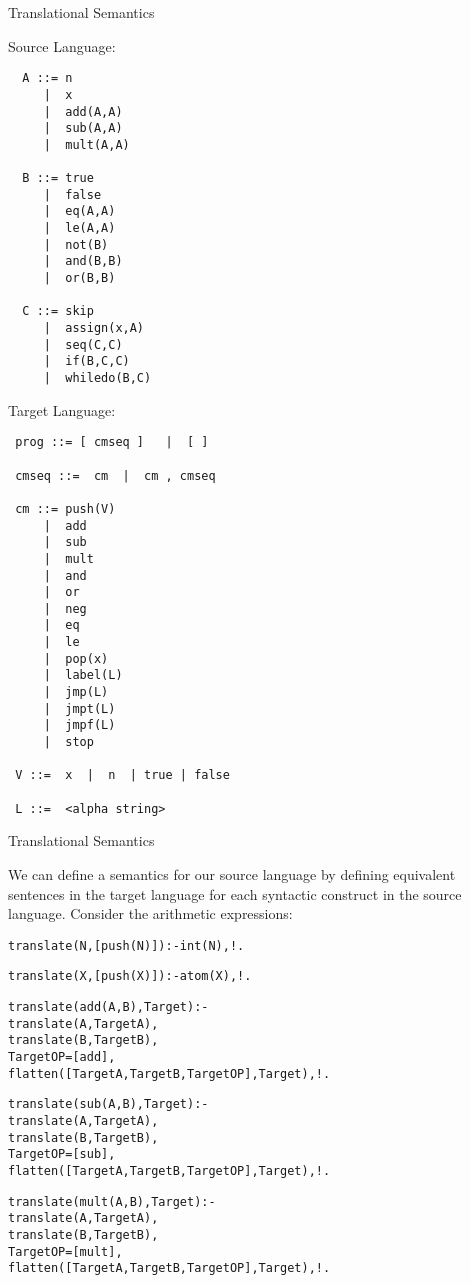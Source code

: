 \documentclass{beamer}
\begin{document}
\begin{frame}[fragile]{Translational Semantics}
\tiny
\begin{minipage}[t]{1.9in}
Source Language:
\begin{verbatim}
  A ::= n
     |  x
     |  add(A,A)
     |  sub(A,A)
     |  mult(A,A)

  B ::= true
     |  false
     |  eq(A,A)
     |  le(A,A)
     |  not(B)
     |  and(B,B)
     |  or(B,B)

  C ::= skip
     |  assign(x,A)
     |  seq(C,C)
     |  if(B,C,C)
     |  whiledo(B,C)
\end{verbatim}
\end{minipage}
\begin{minipage}[t]{1.9in}
Target Language:
\begin{verbatim}
 prog ::= [ cmseq ]   |  [ ]

 cmseq ::=  cm  |  cm , cmseq

 cm ::= push(V)
     |  add
     |  sub
     |  mult
     |  and
     |  or
     |  neg
     |  eq
     |  le
     |  pop(x)
     |  label(L)
     |  jmp(L)
     |  jmpt(L)
     |  jmpf(L)
     |  stop

 V ::=  x  |  n  | true | false

 L ::=  <alpha string>
\end{verbatim}
\end{minipage}
\end{frame}

\begin{frame}[fragile]{Translational Semantics}

\small
We can define a semantics for our source language by defining equivalent sentences
in the target language for each syntactic construct in the source language.
Consider the arithmetic expressions:
\tiny
\begin{alltt}
translate(N,[push(N)]) :- int(N),!.

translate(X,[push(X)]) :- atom(X),!.

translate(add(A,B),Target) :-
    translate(A,TargetA),
    translate(B,TargetB),
    TargetOP = [add],
    flatten([TargetA,TargetB,TargetOP],Target),!.
 
translate(sub(A,B),Target) :-
    translate(A,TargetA),
    translate(B,TargetB),
    TargetOP = [sub],
    flatten([TargetA,TargetB,TargetOP],Target),!.
     
translate(mult(A,B),Target) :-
    translate(A,TargetA),
    translate(B,TargetB),
    TargetOP = [mult],
    flatten([TargetA,TargetB,TargetOP],Target),!.
\end{alltt}
\end{frame}
\end{document}
